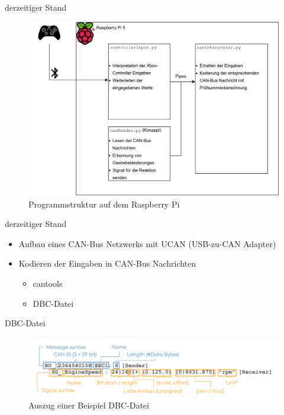 \documentclass[usenames, dvipsnames, aspectratio=75]{beamer}
\begin{document}
\begin{frame}{derzeitiger Stand}
    \begin{figure}
        \centering
        \includegraphics[width=0.85\linewidth]{assets/piKonzept.png}
        \caption{Programmstruktur auf dem Raspberry Pi} 
    \end{figure}
\end{frame}

\begin{frame}{derzeitiger Stand}
    \begin{itemize}
        \item Aufbau eines CAN-Bus Netzwerks mit UCAN (USB-zu-CAN Adapter)
        \item Kodieren der Eingaben in CAN-Bus Nachrichten \begin{itemize}
            \item cantools
            \item DBC-Datei
        \end{itemize}
    \end{itemize}   
\end{frame}

\begin{frame}{DBC-Datei}
    \begin{figure}
        \centering
        \includegraphics[width=1\linewidth]{assets/CAN-DBC-File-Format-Explained-Intro-Basics_2.png}
        \caption{Auszug einer Beispiel DBC-Datei}
    \end{figure}
\end{frame}
\end{document}
